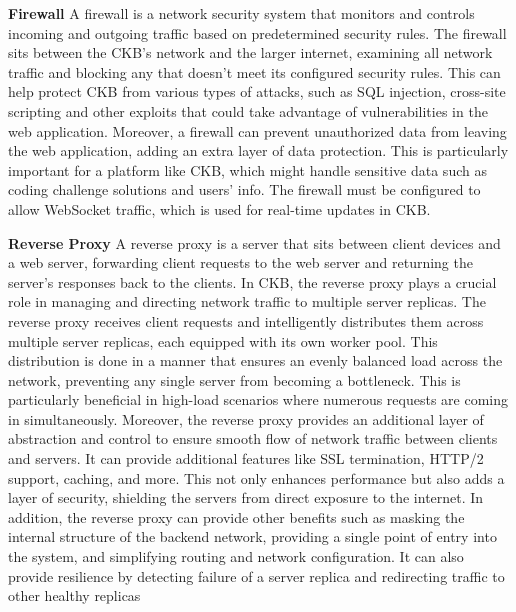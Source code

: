 \textbf{Firewall}\newline
A firewall is a network security system that monitors and controls incoming and outgoing traffic based on predetermined security rules. 
The firewall sits between the CKB’s network and the larger internet, examining all network traffic and blocking any 
that doesn’t meet its configured security rules. This can help protect CKB from various types of attacks, 
such as SQL injection, cross-site scripting and other exploits that could take advantage of vulnerabilities in the web application. 
Moreover, a firewall can prevent unauthorized data from leaving the web application, adding an extra layer of data protection. 
This is particularly important for a platform like CKB, which might handle sensitive data such as coding challenge solutions and users’ info. 
The firewall must be configured to allow WebSocket traffic, which is used for real-time updates in CKB.

\textbf{Reverse Proxy}\newline
A reverse proxy is a server that sits between client devices and a web server, forwarding client requests to the web server and returning the server’s 
responses back to the clients. In CKB, the reverse proxy plays a crucial role in managing and directing network traffic to multiple server replicas. 
The reverse proxy receives client requests and intelligently distributes them across multiple server replicas, each equipped with its own worker pool. 
This distribution is done in a manner that ensures an evenly balanced load across the network, preventing any single server from becoming a bottleneck. 
This is particularly beneficial in high-load scenarios where numerous requests are coming in simultaneously.\newline
Moreover, the reverse proxy provides an additional layer of abstraction and control to ensure smooth flow of network traffic between clients and servers. 
It can provide additional features like SSL termination, HTTP/2 support, caching, and more. This not only enhances performance but also adds a layer of security, 
shielding the servers from direct exposure to the internet.\newline
In addition, the reverse proxy can provide other benefits such as masking the internal structure of the backend network, providing a single point of entry into the system, 
and simplifying routing and network configuration. It can also provide resilience by detecting failure of a server replica and redirecting traffic to other healthy replicas


